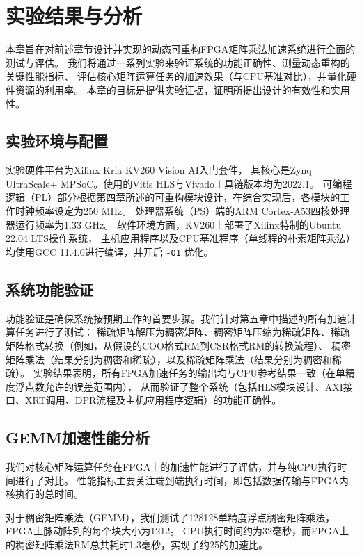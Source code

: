 \chapter{实验结果与分析}

本章旨在对前述章节设计并实现的动态可重构FPGA矩阵乘法加速系统进行全面的测试与评估。
我们将通过一系列实验来验证系统的功能正确性、测量动态重构的关键性能指标、
评估核心矩阵运算任务的加速效果（与CPU基准对比），并量化硬件资源的利用率。
本章的目标是提供实验证据，证明所提出设计的有效性和实用性。

\section{实验环境与配置}

实验硬件平台为Xilinx Kria KV260 Vision AI入门套件，
其核心是Zynq UltraScale+ MPSoC。使用的Vitis HLS与Vivado工具链版本均为2022.1。
可编程逻辑（PL）部分根据第四章所述的可重构模块设计，在综合实现后，各模块的工作时钟频率设定为250 MHz。
处理器系统（PS）端的ARM Cortex-A53四核处理器运行频率为1.33 GHz。
软件环境方面，KV260上部署了Xilinx特制的Ubuntu 22.04 LTS操作系统，
主机应用程序以及CPU基准程序（单线程的朴素矩阵乘法）均使用GCC 11.4.0进行编译，并开启 \verb|-O1| 优化。

\section{系统功能验证}

功能验证是确保系统按预期工作的首要步骤。我们针对第五章中描述的所有加速计算任务进行了测试：
稀疏矩阵解压为稠密矩阵、稠密矩阵压缩为稀疏矩阵、稀疏矩阵格式转换（例如，从假设的COO格式RM到CSR格式RM的转换流程）、
稠密矩阵乘法（结果分别为稠密和稀疏），以及稀疏矩阵乘法（结果分别为稠密和稀疏）。
实验结果表明，所有FPGA加速任务的输出均与CPU参考结果一致（在单精度浮点数允许的误差范围内），
从而验证了整个系统（包括HLS模块设计、AXI接口、XRT调用、DPR流程及主机应用程序逻辑）的功能正确性。

\section{GEMM加速性能分析}

我们对核心矩阵运算任务在FPGA上的加速性能进行了评估，并与纯CPU执行时间进行了对比。
性能指标主要关注端到端执行时间，即包括数据传输与FPGA内核执行的总时间。

对于稠密矩阵乘法（GEMM），我们测试了128\texttimes{}128单精度浮点稠密矩阵乘法，FPGA上脉动阵列的每个块大小为12\texttimes{}12。
CPU执行时间约为32毫秒，而FPGA上的稠密矩阵乘法RM总共耗时1.3毫秒，实现了约25\texttimes{}的加速比。

